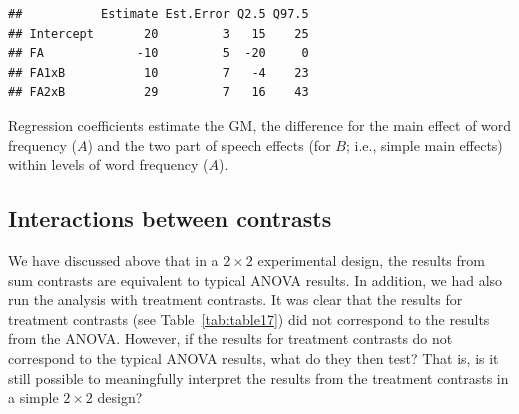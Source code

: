 \documentclass[12pt,]{krantz}
\newenvironment{Shaded}{\begin{snugshade}}{\end{snugshade}}
\newcommand{\KeywordTok}[1]{\textcolor[rgb]{0.13,0.29,0.53}{\textbf{#1}}}
\newcommand{\DataTypeTok}[1]{\textcolor[rgb]{0.13,0.29,0.53}{#1}}
\newcommand{\DecValTok}[1]{\textcolor[rgb]{0.00,0.00,0.81}{#1}}
\newcommand{\StringTok}[1]{\textcolor[rgb]{0.31,0.60,0.02}{#1}}
\newcommand{\OperatorTok}[1]{\textcolor[rgb]{0.81,0.36,0.00}{\textbf{#1}}}
\newcommand{\NormalTok}[1]{#1}
\theoremstyle{definition}
\theoremstyle{definition}
\theoremstyle{definition}
\theoremstyle{remark}
\begin{document}
\begin{Shaded}
\end{Shaded}

\begin{verbatim}
##           Estimate Est.Error Q2.5 Q97.5
## Intercept       20         3   15    25
## FA             -10         5  -20     0
## FA1xB           10         7   -4    23
## FA2xB           29         7   16    43
\end{verbatim}

Regression coefficients estimate the GM, the difference for the main
effect of word frequency (\(A\)) and the two part of speech effects (for
\(B\); i.e., simple main effects) within levels of word frequency
(\(A\)).

\subsection{Interactions between
contrasts}\label{interactions-between-contrasts}

We have discussed above that in a \(2 \times 2\) experimental design,
the results from sum contrasts are equivalent to typical ANOVA results.
In addition, we had also run the analysis with treatment contrasts. It
was clear that the results for treatment contrasts (see
Table~\ref{tab:table17}) did not correspond to the results from the
ANOVA. However, if the results for treatment contrasts do not correspond
to the typical ANOVA results, what do they then test? That is, is it
still possible to meaningfully interpret the results from the treatment
contrasts in a simple \(2 \times 2\) design?
\end{document}
